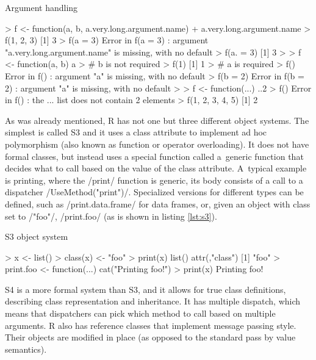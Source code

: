 {\begin{listing}[htbp]
  \caption{\label{lst:args}Argument handling}
  \begin{rcode}
> f <- function(a, b, a.very.long.argument.name)
+     a.very.long.argument.name
> f(1, 2, 3)
[1] 3
> f(a = 3)
Error in f(a = 3) : 
  argument "a.very.long.argument.name" is missing, with no default
> f(a. = 3)
[1] 3
>
> f <- function(a, b) a
> # b is not required
> f(1)
[1] 1
> # a is required
> f()
Error in f() : argument "a" is missing, with no default
> f(b = 2)
Error in f(b = 2) : argument "a" is missing, with no default
>
> f <- function(...) ..2
> f()
Error in f() : the ... list does not contain 2 elements
> f(1, 2, 3, 4, 5)
[1] 2
  \end{rcode}
\end{listing}

As was already mentioned, R has not one but three different object systems. The simplest is called S3 and it uses a class attribute to implement ad hoc polymorphism (also known as function or operator overloading). It does not have formal classes, but instead uses a special function called a~generic function that decides what to call based on the value of the class attribute. A~typical example is printing, where the \rinline/print/ function is generic, its body consists of a call to a dispatcher \rinline/UseMethod("print")/. Specialized versions for different types can be defined, such as \rinline/print.data.frame/ for data frames, or, given an object with class set to \rinline/"foo"/, \rinline/print.foo/ (as is shown in listing \ref{lst:s3}).


\begin{listing}[htbp]
  \caption{\label{lst:s3}S3 object system}
  \begin{rcode}
> x <- list()
> class(x) <- "foo"
> print(x)
list()
attr(,"class")
[1] "foo"
> print.foo <- function(...) cat("Printing foo!\n")
> print(x)
Printing foo!
  \end{rcode}
\end{listing}

S4 is a more formal system than S3, and it allows for true class definitions, describing class representation and inheritance. It has multiple dispatch, which means that dispatchers can pick which method to call based on multiple arguments. R also has reference classes that implement message passing style. Their objects are modified in place (as opposed to the standard pass by value semantics).

}
